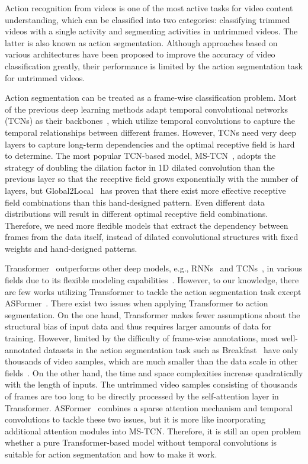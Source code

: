 \documentclass[letterpaper]{article} \usepackage[submission]{aaai23}  \usepackage{times}  \usepackage{helvet}  \usepackage{courier}  \usepackage[hyphens]{url}  \usepackage{graphicx} \urlstyle{rm} \def\UrlFont{\rm}  \usepackage{natbib}  \usepackage{caption} \frenchspacing  \setlength{\pdfpagewidth}{8.5in} \setlength{\pdfpageheight}{11in} \usepackage{algorithm}
\begin{document}
Action recognition from videos is one of the most active tasks for video content understanding, which can be classified into two categories: classifying trimmed videos with a single activity and segmenting activities in untrimmed videos. The latter is also known as action segmentation. Although approaches based on various architectures have been proposed to improve the accuracy of video classification greatly, their performance is limited by the action segmentation task for untrimmed videos. 

Action segmentation can be treated as a frame-wise classification problem. Most of the previous deep learning methods adapt temporal convolutional networks (TCNs) as their backbones~\cite{lea2017temporal, farha2019ms, li2020ms}, which utilize temporal convolutions to capture the temporal relationships between different frames. However, TCNs need very deep layers to capture long-term dependencies and the optimal receptive field is hard to determine. The most popular TCN-based model, MS-TCN~\cite{farha2019ms}, adopts the strategy of doubling the dilation factor in 1D dilated convolution than the previous layer so that the receptive field grows exponentially with the number of layers, but Global2Local~\cite{gao2021global2local} has proven that there exist more effective receptive field combinations than this hand-designed pattern. Even different data distributions will result in different optimal receptive field combinations. Therefore, we need more flexible models that extract the dependency between frames from the data itself, instead of dilated convolutional structures with fixed weights and hand-designed patterns.

Transformer~\cite{Transformer} outperforms other deep models, e.g., RNNs~\cite{rnn} and TCNs~\cite{TCN}, in various fields due to its flexible modeling capabilities~\cite{kenton2019bert,girdhar2019video,dosovitskiy2020vit}. However, to our knowledge, there are few works utilizing Transformer to tackle the action segmentation task except ASFormer~\cite{ASFormer}. There exist two issues when applying Transformer to action segmentation. On the one hand, Transformer makes fewer assumptions about the structural bias of input data and thus requires larger amounts of data for training. However, limited by the difficulty of frame-wise annotations, most well-annotated datasets in the action segmentation task such as Breakfast~\cite{kuehne2014language} have only thousands of video samples, which are much smaller than the data scale in other fields~\cite{deng2009imagenet,kay2017kinetics}. On the other hand, the time and space complexities increase quadratically with the length of inputs. The untrimmed video samples consisting of thousands of frames are too long to be directly processed by the self-attention layer in Transformer. ASFormer~\cite{ASFormer} combines a sparse attention mechanism and temporal convolutions to tackle these two issues, but it is more like incorporating additional attention modules into MS-TCN. Therefore, it is still an open problem whether a pure Transformer-based model without temporal convolutions is suitable for action segmentation and how to make it work.
\end{document}
